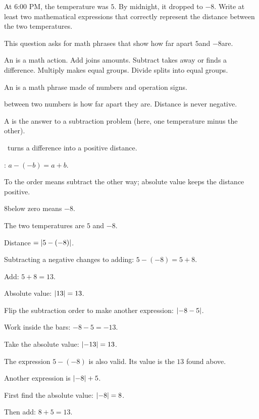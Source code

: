 


At 6:00 PM, the temperature was $5$\degF. By midnight, it dropped to $-8$\degF. Write at least two mathematical expressions that correctly represent the distance between the two temperatures.


This question asks for math phrases that show how far apart $5$\degF and $-8$\degF are.

\begin{words}
  \item An is a math action. Add joins amounts. Subtract takes away or finds a difference. Multiply makes equal groups. Divide splits into equal groups.
  \item An is a math phrase made of numbers and operation signs.
  \item {}between two numbers is how far apart they are. Distance is never negative.
  \item A is the answer to a subtraction problem (here, one temperature minus the other).
  \item {}\barsym\ turns a difference into a positive distance.
  \item {}: $a-(-b) = a+b$.
  \item To the order means subtract the other way; absolute value keeps the distance positive.
  \item $8$\degF below zero means $-8$\degF.
\end{words}

\begin{steps}
  \item The two temperatures are $5$ and $-8$.
  \item Distance $= \left\lvert 5-(-8) \right\rvert$.
  \item Subtracting a negative changes to adding: $5 - (-8) = 5 + 8$.
  \item Add: $5 + 8 = 13$.
  \item Absolute value: $\left\lvert 13 \right\rvert = 13$.
  \item Flip the subtraction order to make another expression: $\left\lvert -8-5 \right\rvert$.
  \item Work inside the bars: $-8 - 5 = -13$.
  \item Take the absolute value: $\left\lvert -13 \right\rvert = 13$.
  \item The expression $5-(-8)$ is also valid. Its value is the $13$ found above.
  \item Another expression is $\left\lvert -8 \right\rvert + 5$.
  \item First find the absolute value: $\left\lvert -8 \right\rvert = 8$.
  \item Then add: $8 + 5 = 13$.
\end{steps}


